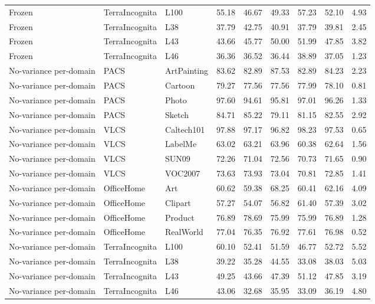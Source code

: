 \begin{longtable}{lllrrrrrr}
Frozen & TerraIncognita & L100 & 55.18 & 46.67 & 49.33 & 57.23 & 52.10 & 4.93 \\
Frozen & TerraIncognita & L38 & 37.79 & 42.75 & 40.91 & 37.79 & 39.81 & 2.45 \\
Frozen & TerraIncognita & L43 & 43.66 & 45.77 & 50.00 & 51.99 & 47.85 & 3.82 \\
Frozen & TerraIncognita & L46 & 36.36 & 36.52 & 36.44 & 38.89 & 37.05 & 1.23 \\
No-variance per-domain & PACS & ArtPainting & 83.62 & 82.89 & 87.53 & 82.89 & 84.23 & 2.23 \\
No-variance per-domain & PACS & Cartoon & 79.27 & 77.56 & 77.56 & 77.99 & 78.10 & 0.81 \\
No-variance per-domain & PACS & Photo & 97.60 & 94.61 & 95.81 & 97.01 & 96.26 & 1.33 \\
No-variance per-domain & PACS & Sketch & 84.71 & 85.22 & 79.11 & 81.15 & 82.55 & 2.92 \\
No-variance per-domain & VLCS & Caltech101 & 97.88 & 97.17 & 96.82 & 98.23 & 97.53 & 0.65 \\
No-variance per-domain & VLCS & LabelMe & 63.02 & 63.21 & 63.96 & 60.38 & 62.64 & 1.56 \\
No-variance per-domain & VLCS & SUN09 & 72.26 & 71.04 & 72.56 & 70.73 & 71.65 & 0.90 \\
No-variance per-domain & VLCS & VOC2007 & 73.63 & 73.93 & 73.04 & 70.81 & 72.85 & 1.41 \\
No-variance per-domain & OfficeHome & Art & 60.62 & 59.38 & 68.25 & 60.41 & 62.16 & 4.09 \\
No-variance per-domain & OfficeHome & Clipart & 57.27 & 54.07 & 56.82 & 61.40 & 57.39 & 3.02 \\
No-variance per-domain & OfficeHome & Product & 76.89 & 78.69 & 75.99 & 75.99 & 76.89 & 1.28 \\
No-variance per-domain & OfficeHome & RealWorld & 77.04 & 76.35 & 76.92 & 77.61 & 76.98 & 0.52 \\
No-variance per-domain & TerraIncognita & L100 & 60.10 & 52.41 & 51.59 & 46.77 & 52.72 & 5.52 \\
No-variance per-domain & TerraIncognita & L38 & 39.22 & 35.28 & 44.55 & 33.08 & 38.03 & 5.03 \\
No-variance per-domain & TerraIncognita & L43 & 49.25 & 43.66 & 47.39 & 51.12 & 47.85 & 3.19 \\
No-variance per-domain & TerraIncognita & L46 & 43.06 & 32.68 & 35.95 & 33.09 & 36.19 & 4.80 \\

\end{longtable}
